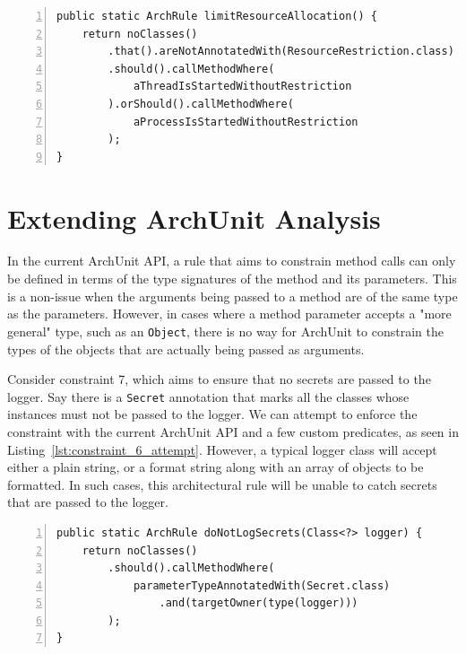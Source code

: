 \begin{minipage}{\linewidth}
\begin{lstlisting}[caption={Rule definition for constraint 5.}, captionpos=b, label=lst:constraint_5_impl, numbers=left]
public static ArchRule limitResourceAllocation() {
    return noClasses()
        .that().areNotAnnotatedWith(ResourceRestriction.class)
        .should().callMethodWhere(
            aThreadIsStartedWithoutRestriction
        ).orShould().callMethodWhere(
            aProcessIsStartedWithoutRestriction
        );
}
\end{lstlisting}
\end{minipage}




\section{Extending ArchUnit Analysis}

In the current ArchUnit API, a rule that aims to constrain method calls can only be defined in terms of the type signatures of the method and its parameters. This is a non-issue when the arguments being passed to a method are of the same type as the parameters. However, in cases where a method parameter accepts a "more general" type, such as an \texttt{Object}, there is no way for ArchUnit to constrain the types of the objects that are actually being passed as arguments.

Consider constraint 7, which aims to ensure that no secrets are passed to the logger. Say there is a \texttt{Secret} annotation that marks all the classes whose instances must not be passed to the logger. We can attempt to enforce the constraint with the current ArchUnit API and a few custom predicates, as seen in Listing~\ref{lst:constraint_6_attempt}. However, a typical logger class will accept either a plain string, or a format string along with an array of objects to be formatted. In such cases, this architectural rule will be unable to catch secrets that are passed to the logger.

\begin{minipage}{\linewidth}
\begin{lstlisting}[caption={A first attempt to implement constraint 7.}, captionpos=b, label=lst:constraint_6_attempt, numbers=left]
public static ArchRule doNotLogSecrets(Class<?> logger) {
    return noClasses()
        .should().callMethodWhere(
            parameterTypeAnnotatedWith(Secret.class)
                .and(targetOwner(type(logger)))
        );
}
\end{lstlisting}
\end{minipage}

